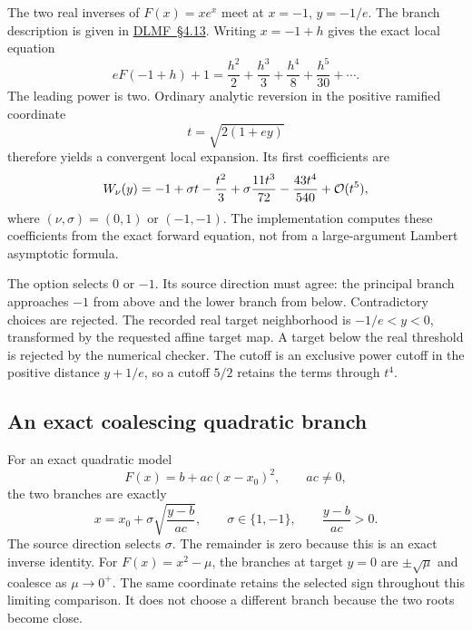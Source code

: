 The two real inverses of $F(x)=xe^x$ meet at $x=-1$, $y=-1/e$.
The branch description is given in
\href{https://dlmf.nist.gov/4.13}{DLMF~\S4.13}.
Writing $x=-1+h$ gives the exact local equation
\begin{equation}
 eF(-1+h)+1
 =\frac{h^2}{2}+\frac{h^3}{3}+\frac{h^4}{8}
 +\frac{h^5}{30}+\cdots.
 \label{eq:Lambert-threshold-forward}
\end{equation}
The leading power is two. Ordinary analytic reversion in the positive
ramified coordinate
\begin{equation}
 t=\sqrt{2(1+ey)}
 \label{eq:Lambert-threshold-uniformizer}
\end{equation}
therefore yields a convergent local expansion. Its first coefficients are
\begin{equation}
 W_\nu(y)=-1+\sigma t-\frac{t^2}{3}
 +\sigma\frac{11t^3}{72}-\frac{43t^4}{540}+\mathcal O(t^5),
 \label{eq:Lambert-threshold-inverse}
\end{equation}
where $(\nu,\sigma)=(0,1)$ or $(-1,-1)$.
The implementation computes these coefficients from the exact forward
equation, not from a large-argument Lambert asymptotic formula.

The option  selects $0$ or $-1$.
Its source direction must agree: the principal branch approaches $-1$
from above and the lower branch from below. Contradictory choices are
rejected. The recorded real target neighborhood is $-1/e<y<0$,
transformed by the requested affine target map. A target below the real
threshold is rejected by the numerical checker. The cutoff is an
exclusive power cutoff in the positive distance $y+1/e$, so a cutoff
$5/2$ retains the terms through $t^4$.

\subsection{An exact coalescing quadratic branch}

For an exact quadratic model
\begin{equation}
 F(x)=b+a c(x-x_0)^2,\qquad ac\ne0,
 \label{eq:quadratic-threshold-forward}
\end{equation}
the two branches are exactly
\begin{equation}
 x=x_0+\sigma\sqrt{\frac{y-b}{ac}},\qquad
 \sigma\in\{1,-1\},\qquad\frac{y-b}{ac}>0.
 \label{eq:quadratic-threshold-inverse}
\end{equation}
The source direction selects $\sigma$. The remainder is zero because this
is an exact inverse identity. For $F(x)=x^2-\mu$, the branches at target
$y=0$ are $\pm\sqrt\mu$ and coalesce as $\mu\to0^+$. The same coordinate
retains the selected sign throughout this limiting comparison. It does
not choose a different branch because the two roots become close.

